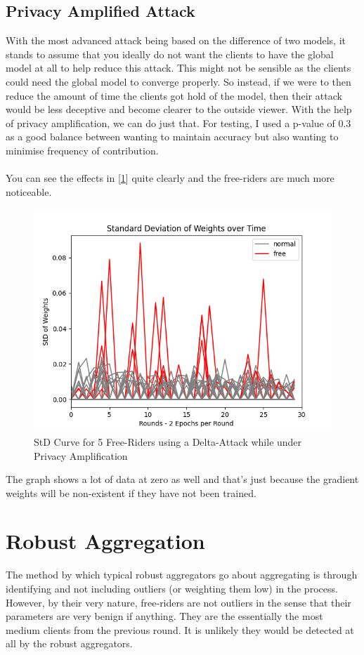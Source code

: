 \subsection{Privacy Amplified Attack}
With the most advanced attack being based on the difference of two models, it stands to assume that you ideally do not want the clients to have the global model at all to help reduce this attack.
This might not be sensible as the clients could need the global model to converge properly.
So instead, if we were to then reduce the amount of time the clients got hold of the model, then their attack would be less deceptive and become clearer to the outside viewer.
With the help of privacy amplification, we can do just that.
For testing, I used a p-value of 0.3 as a good balance between wanting to maintain accuracy but also wanting to minimise frequency of contribution.
\\ \\
You can see the effects in [\ref{fig:std_priv}] quite clearly and the free-riders are much more noticeable.
\begin{figure}[htbp]
	\centering
    \includegraphics[scale=0.5]{free_riders/graphs/priv5.png}
	\caption{StD Curve for 5 Free-Riders using a Delta-Attack while under Privacy Amplification}
	\label{fig:std_priv}
\end{figure}

The graph shows a lot of data at zero as well and that's just because the gradient weights will be non-existent if they have not been trained.


\section{Robust Aggregation}
The method by which typical robust aggregators go about aggregating is through identifying and not including outliers (or weighting them low) in the process.
However, by their very nature, free-riders are not outliers in the sense that their parameters are very benign if anything.
They are the essentially the most medium clients from the previous round. 
It is unlikely they would be detected at all by the robust aggregators.

